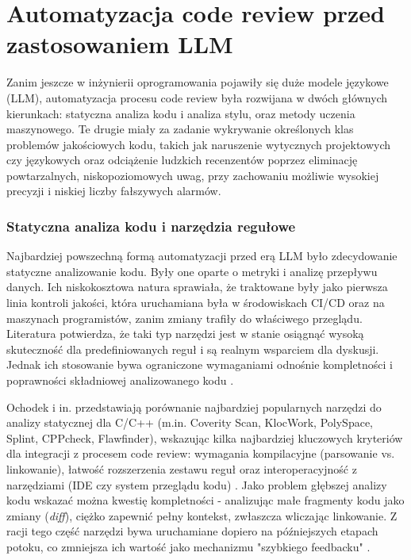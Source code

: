 \section{Automatyzacja code review przed zastosowaniem LLM}
\label{section:automatyzacja_przed_llm}

Zanim jeszcze w inżynierii oprogramowania pojawiły się duże modele językowe (LLM), automatyzacja procesu code review
była rozwijana w dwóch głównych kierunkach: statyczna analiza kodu i analiza stylu, oraz metody uczenia maszynowego.
Te drugie miały za zadanie wykrywanie określonych klas problemów jakościowych kodu, takich jak naruszenie wytycznych projektowych czy
językowych oraz odciążenie ludzkich recenzentów poprzez eliminację powtarzalnych, niskopoziomowych uwag, przy zachowaniu
możliwie wysokiej precyzji i niskiej liczby fałszywych alarmów.

\subsubsection{Statyczna analiza kodu i narzędzia regułowe}
Najbardziej powszechną formą automatyzacji przed erą LLM było zdecydowanie statyczne analizowanie kodu. Były one
oparte o metryki i analizę przepływu danych. Ich niskokosztowa natura sprawiała, że traktowane były jako pierwsza linia
kontroli jakości, która uruchamiana była w środowiskach CI/CD oraz na maszynach programistów, zanim zmiany trafiły do
właściwego przeglądu. Literatura potwierdza, że taki typ narzędzi jest w stanie osiągnąć wysoką skuteczność
dla predefiniowanych reguł i są realnym wsparciem dla dyskusji. Jednak ich stosowanie bywa ograniczone wymaganiami
odnośnie kompletności i poprawności składniowej analizowanego kodu \cite{Ochodek2020}.

Ochodek i in. przedstawiają porównanie najbardziej popularnych narzędzi do analizy statycznej dla C/C++
(m.in. Coverity Scan, KlocWork, PolySpace, Splint, CPPcheck, Flawfinder), wskazując kilka najbardziej kluczowych kryteriów
dla integracji z procesem code review: wymagania kompilacyjne (parsowanie vs. linkowanie), łatwość rozszerzenia zestawu
reguł oraz interoperacyjność z narzędziami (IDE czy system przeglądu kodu) \cite{Ochodek2020}. Jako problem głębszej analizy
kodu wskazać można kwestię kompletności - analizując małe fragmenty kodu jako zmiany (\textit{diff}), ciężko zapewnić
pełny kontekst, zwłaszcza wliczając linkowanie. Z racji tego część narzędzi bywa uruchamiane dopiero na późniejszych
etapach potoku, co zmniejsza ich wartość jako mechanizmu "szybkiego feedbacku" \cite{Ochodek2020}.

